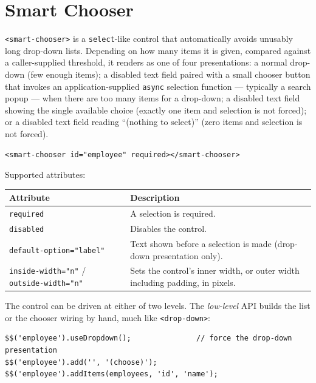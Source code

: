 \section{Smart Chooser}
\label{sec:comp-smart-chooser}

\texttt{<smart-chooser>} is a \texttt{select}-like control that automatically avoids unusably long drop-down lists.  Depending on how many items it is given, compared against a caller-supplied threshold, it renders as one of four presentations: a normal drop-down (few enough items); a disabled text field paired with a small chooser button that invokes an application-supplied \texttt{async} selection function --- typically a search popup --- when there are too many items for a drop-down; a disabled text field showing the single available choice (exactly one item and selection is not forced); or a disabled text field reading ``(nothing to select)'' (zero items and selection is not forced).

\begin{lstlisting}[style=html]
<smart-chooser id="employee" required></smart-chooser>
\end{lstlisting}

\noindent
Supported attributes:

\begin{longtable}{P{3.8cm}P{6.7cm}}
\toprule
\textbf{Attribute} & \textbf{Description} \\
\midrule
\endhead
\texttt{required} & A selection is required. \\
\texttt{disabled} & Disables the control. \\
\texttt{default-}\allowbreak\texttt{option="label"} & Text shown before a selection is made (drop-down presentation only). \\
\texttt{inside-width="n"} / \texttt{outside-width="n"} & Sets the control's inner width, or outer width including padding, in pixels. \\
\bottomrule
\end{longtable}

\noindent
The control can be driven at either of two levels.  The \emph{low-level} API builds the list or the chooser wiring by hand, much like \texttt{<drop-down>}:

\begin{lstlisting}[style=javascript]
$$('employee').useDropdown();               // force the drop-down presentation
$$('employee').add('', '(choose)');
$$('employee').addItems(employees, 'id', 'name');
\end{lstlisting}

